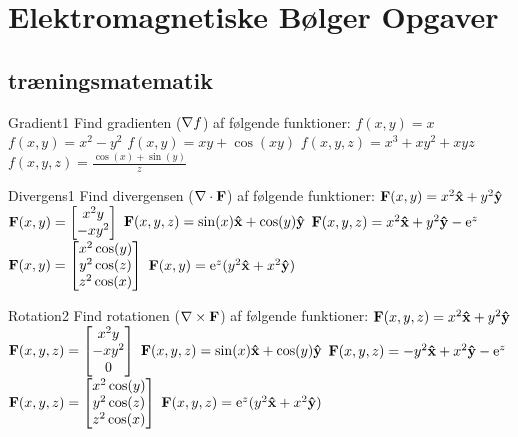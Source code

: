 %
\chapter{Elektromagnetiske Bølger Opgaver}
\section*{træningsmatematik}

\begin{opgave}{Gradient}{1}
Find gradienten ($\mathbf{\nabla} f$) af følgende funktioner:
\opg$f(x,y) = x$
\opg$f(x,y) = x^2-y^2$
\opg$f(x,y) = xy+\cos(xy)$
\opg$f(x,y,z) = x^3+xy^2+xyz$
\opg$f(x,y,z) = \frac{\cos(x)+\sin(y)}{z}$
\end{opgave}

\begin{opgave}{Divergens}{1}
Find divergensen ($\mathbf{\nabla} \cdot \mathbf{F}$) af følgende funktioner:
\opg$\mathbf{F}(x,y) = x^2\mathbf{\hat{x}}+y^2\mathbf{\hat{y}}$
\opg$\mathbf{F}(x,y) = \begin{bmatrix} x^2y \\ -xy^2 \end{bmatrix}$
\opg$\mathbf{F}(x,y,z) = \sin(x)\mathbf{\hat{x}}+\cos(y)\mathbf{\hat{y}}$
\opg$\mathbf{F}(x,y,z) = x^2\mathbf{\hat{x}}+y^2\mathbf{\hat{y}}-\mathrm{e}^z$
\opg$\mathbf{F}(x,y) = \begin{bmatrix} x^2\cos(y) \\ y^2\cos(z) \\ z^2\cos(x) \end{bmatrix}$
\opg$\mathbf{F}(x,y) = \mathrm{e}^z(y^2\mathbf{\hat{x}}+x^2\mathbf{\hat{y}})$
\end{opgave}

\begin{opgave}{Rotation}{2}
Find rotationen ($\mathbf{\nabla} \times \mathbf{F}$) af følgende funktioner:
\opg$\mathbf{F}(x,y,z) = x^2\mathbf{\hat{x}}+y^2\mathbf{\hat{y}}$
\opg$\mathbf{F}(x,y,z) = \begin{bmatrix} x^2y \\ -xy^2 \\ 0 \end{bmatrix}$
\opg$\mathbf{F}(x,y,z) = \sin(x)\mathbf{\hat{x}}+\cos(y)\mathbf{\hat{y}}$
\opg$\mathbf{F}(x,y,z) = -y^2\mathbf{\hat{x}}+x^2\mathbf{\hat{y}}-\mathrm{e}^z$
\opg$\mathbf{F}(x,y,z) = \begin{bmatrix} x^2\cos(y) \\ y^2\cos(z) \\ z^2\cos(x) \end{bmatrix}$
\opg$\mathbf{F}(x,y,z) = \mathrm{e}^z(y^2\mathbf{\hat{x}}+x^2\mathbf{\hat{y}})$
\end{opgave}



